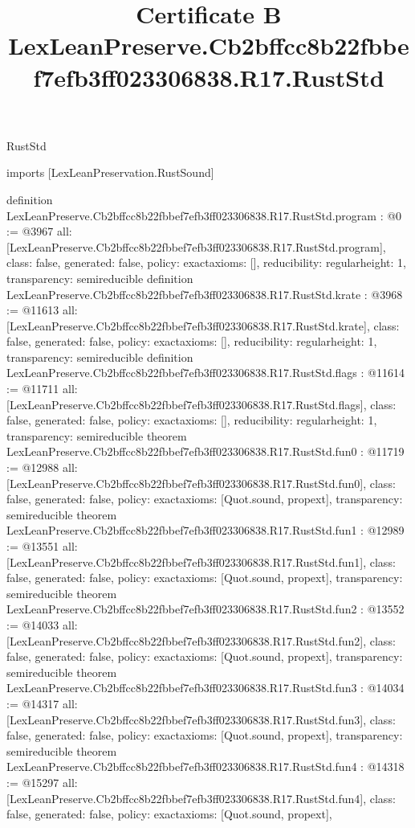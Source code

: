 \begin{lexlean}{RustStd}
\title{Certificate B LexLeanPreserve.Cb2bffcc8b22fbbef7efb3ff023306838.R17.RustStd}
\begin{coremodule}
imports [LexLeanPreservation.RustSound]

definition LexLeanPreserve.Cb2bffcc8b22fbbef7efb3ff023306838.R17.RustStd.program : @0 := @3967 {
  all: [LexLeanPreserve.Cb2bffcc8b22fbbef7efb3ff023306838.R17.RustStd.program],
  class: false,
  generated: false,
  policy: exact{axioms: []},
  reducibility: regular{height: 1},
  transparency: semireducible
}
definition LexLeanPreserve.Cb2bffcc8b22fbbef7efb3ff023306838.R17.RustStd.krate : @3968 := @11613 {
  all: [LexLeanPreserve.Cb2bffcc8b22fbbef7efb3ff023306838.R17.RustStd.krate],
  class: false,
  generated: false,
  policy: exact{axioms: []},
  reducibility: regular{height: 1},
  transparency: semireducible
}
definition LexLeanPreserve.Cb2bffcc8b22fbbef7efb3ff023306838.R17.RustStd.flags : @11614 := @11711 {
  all: [LexLeanPreserve.Cb2bffcc8b22fbbef7efb3ff023306838.R17.RustStd.flags],
  class: false,
  generated: false,
  policy: exact{axioms: []},
  reducibility: regular{height: 1},
  transparency: semireducible
}
theorem LexLeanPreserve.Cb2bffcc8b22fbbef7efb3ff023306838.R17.RustStd.fun0 : @11719 := @12988 {
  all: [LexLeanPreserve.Cb2bffcc8b22fbbef7efb3ff023306838.R17.RustStd.fun0],
  class: false,
  generated: false,
  policy: exact{axioms: [Quot.sound, propext]},
  transparency: semireducible
}
theorem LexLeanPreserve.Cb2bffcc8b22fbbef7efb3ff023306838.R17.RustStd.fun1 : @12989 := @13551 {
  all: [LexLeanPreserve.Cb2bffcc8b22fbbef7efb3ff023306838.R17.RustStd.fun1],
  class: false,
  generated: false,
  policy: exact{axioms: [Quot.sound, propext]},
  transparency: semireducible
}
theorem LexLeanPreserve.Cb2bffcc8b22fbbef7efb3ff023306838.R17.RustStd.fun2 : @13552 := @14033 {
  all: [LexLeanPreserve.Cb2bffcc8b22fbbef7efb3ff023306838.R17.RustStd.fun2],
  class: false,
  generated: false,
  policy: exact{axioms: [Quot.sound, propext]},
  transparency: semireducible
}
theorem LexLeanPreserve.Cb2bffcc8b22fbbef7efb3ff023306838.R17.RustStd.fun3 : @14034 := @14317 {
  all: [LexLeanPreserve.Cb2bffcc8b22fbbef7efb3ff023306838.R17.RustStd.fun3],
  class: false,
  generated: false,
  policy: exact{axioms: [Quot.sound, propext]},
  transparency: semireducible
}
theorem LexLeanPreserve.Cb2bffcc8b22fbbef7efb3ff023306838.R17.RustStd.fun4 : @14318 := @15297 {
  all: [LexLeanPreserve.Cb2bffcc8b22fbbef7efb3ff023306838.R17.RustStd.fun4],
  class: false,
  generated: false,
  policy: exact{axioms: [Quot.sound, propext]},
}
\end{coremodule}
\end{lexlean}
